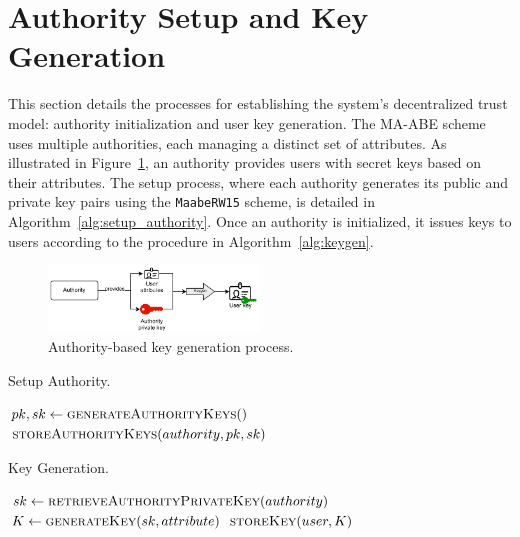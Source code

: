 \documentclass[cic,tc,english]{iiufrgs}
\numberwithin{algorithm}{chapter}
\begin{document}
    \section{Authority Setup and Key Generation}
        \label{sec:auth_setup}

        This section details the processes for establishing the system's decentralized trust model: authority initialization and user key generation. The MA-ABE scheme uses multiple authorities, each managing a distinct set of attributes. As illustrated in Figure~\ref{fig:keygen_diagram}, an authority provides users with secret keys based on their attributes. The setup process, where each authority generates its public and private key pairs using the \texttt{MaabeRW15} scheme, is detailed in Algorithm~\ref{alg:setup_authority}. Once an authority is initialized, it issues keys to users according to the procedure in Algorithm~\ref{alg:keygen}.

        \begin{figure}[h]
            \centering
            \includegraphics[width=0.5\textwidth]{images/diagrams/keygen_diagram.pdf} %
            \caption{Authority-based key generation process.}
            \label{fig:keygen_diagram}
        \end{figure}

        \begin{algorithm}[h]
            \caption{Setup Authority.}
            \label{alg:setup_authority}
            \begin{algorithmic}[1]
                \State $pk, sk \gets \textsc{generateAuthorityKeys}()$
                \State $\textsc{storeAuthorityKeys}(authority, pk, sk)$
            \EndProcedure
            \end{algorithmic}
        \end{algorithm}

        \begin{algorithm}[h]
            \caption{Key Generation.}
            \label{alg:keygen}
            \begin{algorithmic}[1]
                \State $sk \gets \textsc{retrieveAuthorityPrivateKey}(authority)$
                \State $K \gets \textsc{generateKey}(sk, attribute)$
                \State $\textsc{storeKey}(user, K)$
            \EndProcedure
            \end{algorithmic}
        \end{algorithm}
\end{document}
